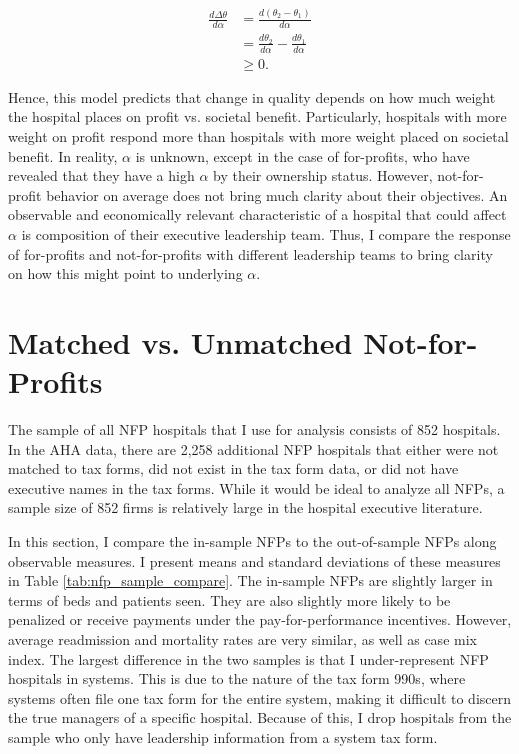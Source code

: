 \documentclass[12pt]{article}
\begin{document}
    \begin{align*}
        \frac{d\Delta\theta}{d\alpha}&=\frac{d(\theta_2-\theta_1)}{d\alpha}\\
        &=\frac{d\theta_2}{d\alpha}-\frac{d\theta_1}{d\alpha}\\
        &\geq 0.
    \end{align*}


    Hence, this model predicts that change in quality depends on how much weight the hospital places on profit vs. societal benefit. Particularly, hospitals with more weight on profit respond more than hospitals with more weight placed on societal benefit. In reality, $\alpha$ is unknown, except in the case of for-profits, who have revealed that they have a high $\alpha$ by their ownership status. However, not-for-profit behavior on average does not bring much clarity about their objectives. An observable and economically relevant characteristic of a hospital that could affect $\alpha$ is composition of their executive leadership team. Thus, I compare the response of for-profits and not-for-profits with different leadership teams to bring clarity on how this might point to underlying $\alpha$.


\section{Matched vs. Unmatched Not-for-Profits}\label{app:matched}

The sample of all NFP hospitals that I use for analysis consists of 852 hospitals. In the AHA data, there are 2,258 additional NFP hospitals that either were not matched to tax forms, did not exist in the tax form data, or did not have executive names in the tax forms. While it would be ideal to analyze all NFPs, a sample size of 852 firms is relatively large in the hospital executive literature. 

In this section, I compare the in-sample NFPs to the out-of-sample NFPs along observable measures. I present means and standard deviations of these measures in Table \ref{tab:nfp_sample_compare}. The in-sample NFPs are slightly larger in terms of beds and patients seen. They are also slightly more likely to be penalized or receive payments under the pay-for-performance incentives. However, average readmission and mortality rates are very similar, as well as case mix index. The largest difference in the two samples is that I under-represent NFP hospitals in systems. This is due to the nature of the tax form 990s, where systems often file one tax form for the entire system, making it difficult to discern the true managers of a specific hospital. Because of this, I drop hospitals from the sample who only have leadership information from a system tax form. 
\end{document}
